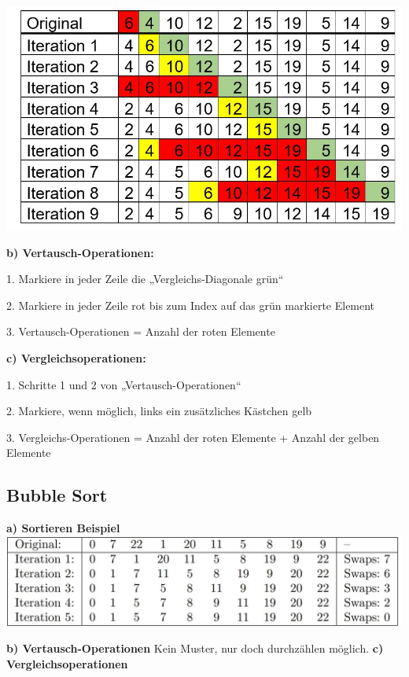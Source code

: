 \documentclass[12pt]{article}
\begin{document}
	\includegraphics[scale=0.5]{InsertionSort}
	\hfill \break
	
	\textbf{b) Vertausch-Operationen:} \hfill \break
	
	1.	Markiere in jeder Zeile die „Vergleichs-Diagonale grün“
	
	2.	Markiere in jeder Zeile rot bis zum Index auf das grün markierte Element
	
	3.	Vertausch-Operationen = Anzahl der roten Elemente\hfill \break
	
	\textbf{c) Vergleichsoperationen:} \hfill \break
	
	1.	Schritte 1 und 2 von „Vertausch-Operationen“
	
	2.	Markiere, wenn möglich, links ein zusätzliches Kästchen gelb
	
	3.	Vergleichs-Operationen = Anzahl der roten Elemente + Anzahl der gelben Elemente
	
	\newpage
	
	\subsection{Bubble Sort}
	\textbf{a) Sortieren Beispiel}
	\newline\newline
	\includegraphics[scale=0.5]{BubbleSort}
	\newline
	
	\textbf{b) Vertausch-Operationen} \newline
	Kein Muster, nur doch durchzählen möglich. \hfill \break
	\newline
	\textbf{c) Vergleichsoperationen}
	
\end{document}
